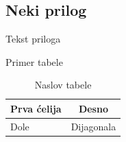 \documentclass[12pt,oneside]{book}
\begin{document}
\begin{appendices}

\chapter{Neki prilog}
Tekst priloga

Primer tabele

\begin{table}[H]
\large
\centering
\caption{Naslov tabele}
\begin{tabular}[H]{|l|c|}
\hline
Prva ćelija & Desno \\ \hline
Dole & Dijagonala \\ \hline
\end{tabular}
\end{table}

\end{appendices}

\renewcommand\indexname{Indeks}
\printindex 

\end{document}
